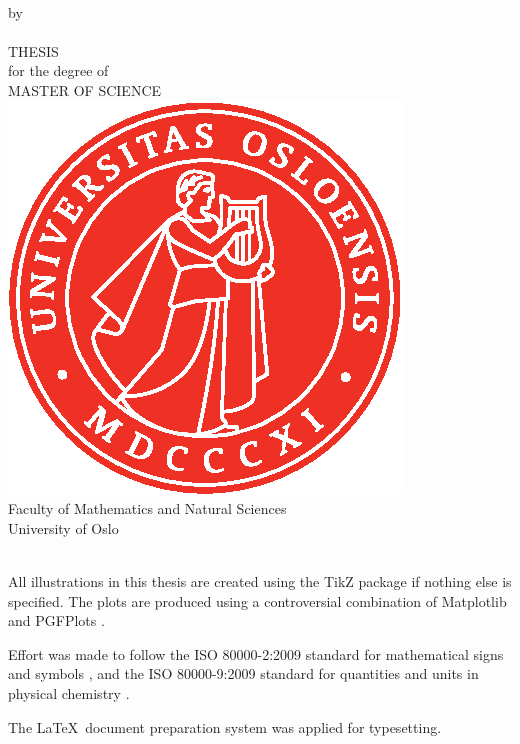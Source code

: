 \thispagestyle{empty}
\begin{center} \vspace{1cm}
    \textbf{\Large{\mtitle}}\\ \vspace{0.5cm}
    \small{by}\\ \vspace{0.5cm}
    \large{\mauthor}\\ \vspace{4.4cm}
    \large{THESIS}\\ \vspace{0.3cm}
    \small{for the degree of}\\ \vspace{0.3cm}
    \large{MASTER OF SCIENCE}\\ \vspace{0.7cm}
    \includegraphics[scale=1.0]{../Images/UiO_Segl_pms485.eps} \\ \vspace{0.5cm}
    \large{Faculty of Mathematics and Natural Sciences \\ University of Oslo} \\ \vspace{0.5cm}
    \small{\mdate}\\ \vfill
\end{center}
\newpage
\vspace*{\fill}
{\setlength{\parindent}{0cm}
All illustrations in this thesis are created using the TikZ package \cite{tantau_graph_2013} if nothing else is specified. The plots are produced using a controversial combination of Matplotlib \cite{hunter_matplotlib:_2007} and PGFPlots \cite{tantau_graph_2013}.\bigskip

Effort was made to follow the ISO 80000-2:2009 standard for mathematical signs and symbols \cite{iso/tc_12_iso_nodate}, and the ISO 80000-9:2009 standard for quantities and units in physical chemistry \cite{iso/tc_12_iso_nodate-1}.\bigskip

The \LaTeX\, document preparation system was applied for typesetting.
} 
\newpage
